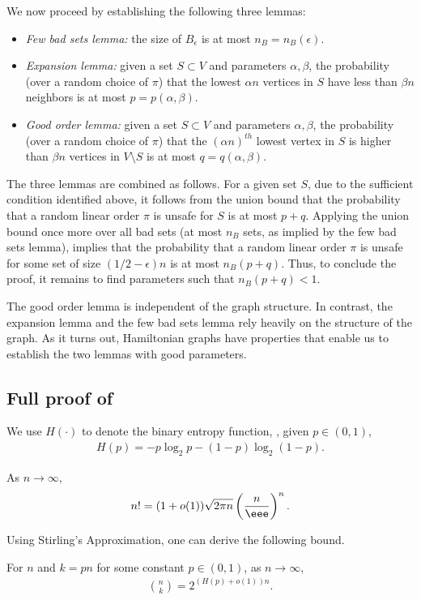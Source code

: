 \documentclass{toc}
\theoremstyle{plain}
\begin{document}
We now proceed by establishing the following three lemmas:
\begin{itemize}
	\item \emph{Few bad sets lemma:} the size of $B_\epsilon$ is at most $n_B=n_B(\epsilon)$.
	\item \emph{Expansion lemma:}
	given a set $S \subset V$ and parameters $\alpha, \beta$, the probability (over a random choice of $\pi$) that the lowest $\alpha n$ vertices in $S$ have less than $\beta n$ neighbors is at most $p=p(\alpha,\beta)$.
	\item \emph{Good order lemma:} given a set $S \subset V$ and parameters $\alpha, \beta$, the probability (over a random choice of $\pi$) that the $(\alpha n)^{th}$ lowest vertex in $S$ is higher than $\beta n$ vertices in $V \setminus S$ is at most $q=q(\alpha,\beta)$.
\end{itemize}

The three lemmas are combined as follows.
For a given set $S$, due to the sufficient condition identified above, it follows from the union bound that the probability that a
%
random linear order $\pi$ is unsafe for $S$ is at most $p+q$.
Applying the union bound once more over all bad sets (at most $n_B$ sets, as implied by the few bad sets lemma), implies that the probability that a
%
random linear order $\pi$ is unsafe for some set of size $(1/2-\epsilon)n$ is at most $n_B(p+q)$.
Thus, to conclude the proof, it remains to find parameters such that $n_B(p+q) < 1$.

The good order lemma is independent of the graph structure.
In contrast, the expansion lemma and the few bad sets lemma rely heavily on the structure of the graph.
As it turns out, Hamiltonian graphs have properties that enable us to establish the two lemmas with good parameters.


\subsection{Full proof of }\label{sec:app-hamiltonian}


We use $H(\cdot)$ to denote the binary entropy function, %
\ie, given $p\in (0,1)$, \begin{eqnarray}H(p)=-p\log_2 p-(1-p)\log_2(1-p).
\end{eqnarray}

\begin{fact}
	As $n\rightarrow\infty$, 
\begin{eqnarray}n!=(1+o(1))\sqrt{2\pi n}\left(\frac{n}{\eee}\right)^n.
		\end{eqnarray}
\end{fact}
Using Stirling's Approximation, one can derive the following bound.
\begin{fact}\label{fact:binom_estimate}
  For $n$ and $k=pn$ for some
constant %
%
$p\in (0,1)$, as $n\rightarrow\infty$,
	\begin{eqnarray}
	\binom{n}{k}=2^{(H(p)+o(1))n}.\label{eq:binom_approx}
	\end{eqnarray}
\end{fact}
\end{document}
